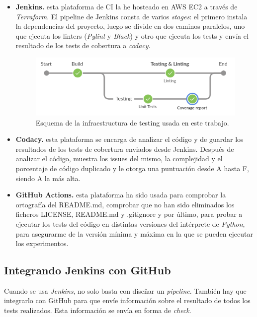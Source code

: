 \begin{itemize}
	\item \textbf{Jenkins.} esta plataforma de CI la he hosteado en AWS EC2 a través de \textit{Terraform}. El pipeline de Jenkins consta de varios \textit{stages}: el primero instala la dependencias del proyecto, luego se divide en dos caminos paralelos, uno que ejecuta los linters (\textit{Pylint} y \textit{Black}) y otro que ejecuta los tests y envía el resultado de los tests de cobertura a \textit{codacy}.

	\begin{figure}[H]
		\includegraphics[width=.6\linewidth]{imagenes/05_Implementacion/jenkinspipeline.png}
		\centering
		\captionsetup{justification=centering}
		\caption{Esquema de la infraestructura de testing usada en este trabajo.}
\end{figure}

	\item \textbf{Codacy.} esta plataforma se encarga de analizar el código y de guardar los resultados de los tests de cobertura enviados desde Jenkins. Después de analizar el código, muestra los issues del mismo, la complejidad y el porcentaje de código duplicado y le otorga una puntuación desde A hasta F, siendo A la más alta.
	
	\item \textbf{GitHub Actions.} esta plataforma ha sido usada para comprobar la ortografía del README.md, comprobar que no han sido eliminados los ficheros LICENSE, README.md y .gitignore y por último, para probar a ejecutar los tests del código en distintas versiones del intérprete de \textit{Python}, para asegurarme de la versión mínima y máxima en la que se pueden ejecutar los experimentos. 
\end{itemize}

\subsection{Integrando Jenkins con GitHub}

Cuando se usa \textit{Jenkins}, no solo basta con diseñar un \textit{pipeline}. También hay que integrarlo con GitHub para que envíe información sobre el resultado de todos los tests realizados. Esta información se envía en forma de \textit{check}.

